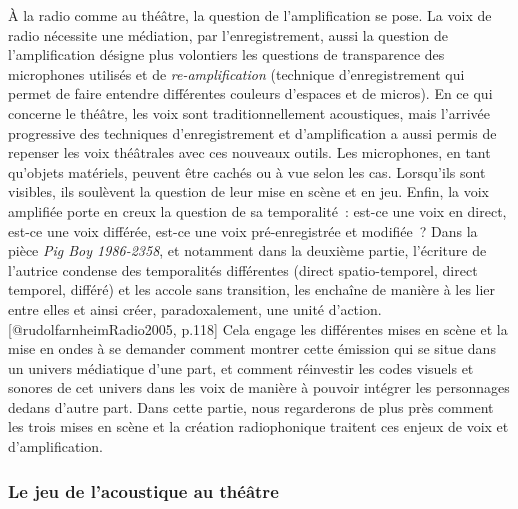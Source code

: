 \documentclass[
]{article}
\begin{document}
À la radio comme au théâtre, la question de l'amplification se pose. La voix de radio nécessite une médiation, par l'enregistrement, aussi la question de l'amplification désigne plus volontiers les questions de transparence des microphones utilisés et de \emph{re-amplification }(technique d'enregistrement qui permet de faire entendre différentes couleurs d'espaces et de micros). En ce qui concerne le théâtre, les voix sont traditionnellement acoustiques, mais l'arrivée progressive des techniques d'enregistrement et d'amplification a aussi permis de repenser les voix théâtrales avec ces nouveaux outils. Les microphones, en tant qu'objets matériels, peuvent être cachés ou à vue selon les cas. Lorsqu'ils sont visibles, ils soulèvent la question de leur mise en scène et en jeu. Enfin, la voix amplifiée porte en creux la question de sa temporalité~: est-ce une voix en direct, est-ce une voix différée, est-ce une voix pré-enregistrée et modifiée~? Dans la pièce \emph{Pig Boy 1986-2358}, et notamment dans la deuxième partie, l'écriture de l'autrice condense des temporalités différentes (direct spatio-temporel, direct temporel, différé) et les accole sans transition, les enchaîne de manière à les lier entre elles et ainsi créer, paradoxalement, une unité d'action.{[}@rudolfarnheimRadio2005, p.118{]} Cela engage les différentes mises en scène et la mise en ondes à se demander comment montrer cette émission qui se situe dans un univers médiatique d'une part, et comment réinvestir les codes visuels et sonores de cet univers dans les voix de manière à pouvoir intégrer les personnages dedans d'autre part. Dans cette partie, nous regarderons de plus près comment les trois mises en scène et la création radiophonique traitent ces enjeux de voix et d'amplification.

\subsubsection{Le jeu de l'acoustique au théâtre}\label{le-jeu-de-lacoustique-au-thuxe9uxe2tre}
\end{document}
